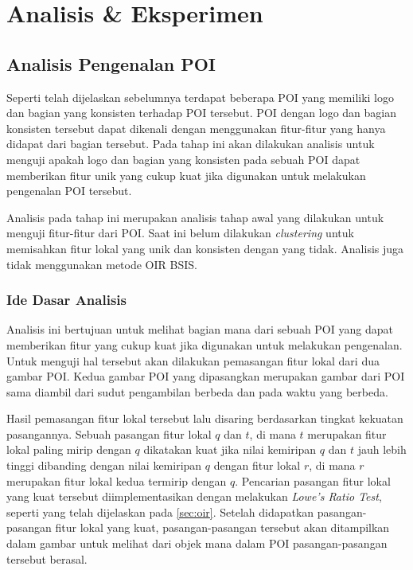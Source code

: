 \chapter{Analisis \& Eksperimen}
\label{chap:analisis}

\section{Analisis Pengenalan POI}
\label{sec:analisis_poi}
Seperti telah dijelaskan sebelumnya terdapat beberapa POI yang memiliki logo dan bagian yang konsisten terhadap POI tersebut. POI dengan logo dan bagian konsisten tersebut dapat dikenali dengan menggunakan fitur-fitur yang hanya didapat dari bagian tersebut. Pada tahap ini akan dilakukan analisis untuk menguji apakah logo dan bagian yang konsisten pada sebuah POI dapat memberikan fitur unik yang cukup kuat jika digunakan untuk melakukan pengenalan POI tersebut.

Analisis pada tahap ini merupakan analisis tahap awal yang dilakukan untuk menguji fitur-fitur dari POI. Saat ini belum dilakukan \textit{clustering} untuk memisahkan fitur lokal yang unik dan konsisten dengan yang tidak. Analisis juga tidak menggunakan metode OIR BSIS.

\subsection{Ide Dasar Analisis}
Analisis ini bertujuan untuk melihat bagian mana dari sebuah POI yang dapat memberikan fitur yang cukup kuat jika digunakan untuk melakukan pengenalan. Untuk menguji hal tersebut akan dilakukan pemasangan fitur lokal dari dua gambar POI. Kedua gambar POI yang dipasangkan merupakan gambar dari POI sama diambil dari sudut pengambilan berbeda dan pada waktu yang berbeda. 

Hasil pemasangan fitur lokal tersebut lalu disaring berdasarkan tingkat kekuatan pasangannya. Sebuah pasangan fitur lokal $q$ dan $t$, di mana $t$ merupakan fitur lokal paling mirip dengan $q$ dikatakan kuat jika nilai kemiripan $q$ dan $t$ jauh lebih tinggi dibanding dengan nilai kemiripan $q$ dengan fitur lokal $r$, di mana $r$ merupakan fitur lokal kedua termirip dengan $q$. Pencarian pasangan fitur lokal yang kuat tersebut diimplementasikan dengan melakukan \textit{Lowe's Ratio Test}, seperti yang telah dijelaskan pada \ref{sec:oir}. Setelah didapatkan pasangan-pasangan fitur lokal yang kuat, pasangan-pasangan tersebut akan ditampilkan dalam gambar untuk melihat dari objek mana dalam POI pasangan-pasangan tersebut berasal. 

